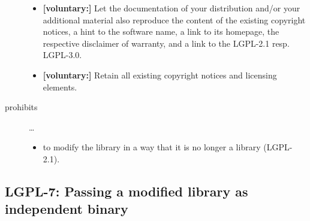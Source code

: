 \begin{description}
\begin{itemize}
  \item \textbf{[voluntary:]} Let the documentation of your distribution and/or
  your additional material also reproduce the content of the existing
  copyright notices, a hint to the software name, a link to its homepage,
  the respective disclaimer of warranty, and a link to the LGPL-2.1 resp.
  LGPL-3.0.
  
  \item \textbf{[voluntary:]} Retain all existing copyright notices and
  licensing elements. 

\end{itemize}

\item[prohibits] \ldots
\begin{itemize}
  \item to modify the library in a way that it is no longer a library
  (LGPL-2.1).
\end{itemize}

\end{description}


\subsection{LGPL-7: Passing a modified library as independent binary}

